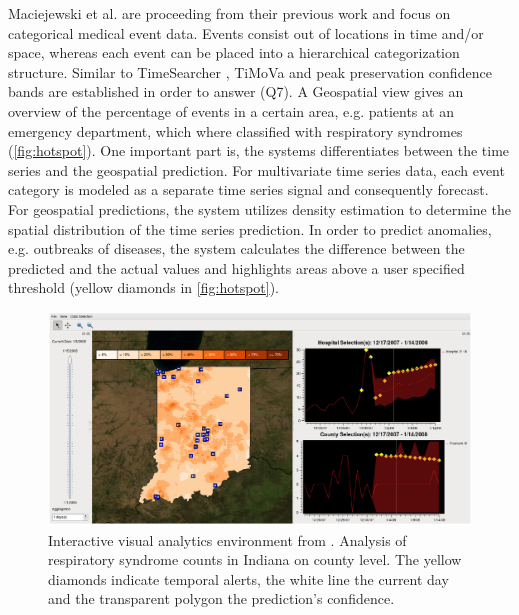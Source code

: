 \documentclass[electronic]{vgtc}             %
\begin{document}
Maciejewski et al. \cite{maciejewski:2011} are proceeding from their previous work \cite{maciejewski:2008, maciejewski:2007} and focus on categorical medical event data.
Events consist out of locations in time and/or space, whereas each event can be placed into a hierarchical categorization structure.
Similar to TimeSearcher \cite{Hochheiser:2004, buono:2005, buono:2007}, TiMoVa \cite{boegl:2014, boegl:2013} and peak preservation \cite{Hao:2009, Hao:2011, Hao:2012} confidence bands are established in order to answer (Q7).
A Geospatial view gives an overview of the percentage of events in a certain area, e.g. patients at an emergency department, which where classified with respiratory syndromes (\autoref{fig:hotspot}).
One important part is, the systems differentiates between the time series and the geospatial prediction.
For multivariate time series data, each event category is modeled as a separate time series signal and consequently forecast. 
For geospatial predictions, the system utilizes density estimation to determine the spatial distribution of the time series prediction. 
In order to predict anomalies, e.g. outbreaks of diseases, the system calculates the difference between the predicted and the actual values and highlights areas above a user specified threshold (yellow diamonds in \autoref{fig:hotspot}).

\begin{figure}[htb]
	\centering
	\includegraphics[width=\columnwidth]{Hotspot}
	\caption{Interactive visual analytics environment from \cite{maciejewski:2011}. Analysis of respiratory syndrome counts in Indiana on county level. The yellow diamonds indicate temporal alerts, the white line the current day and the transparent polygon the prediction's confidence.
	}
	\label{fig:hotspot}
\end{figure}
\end{document}

